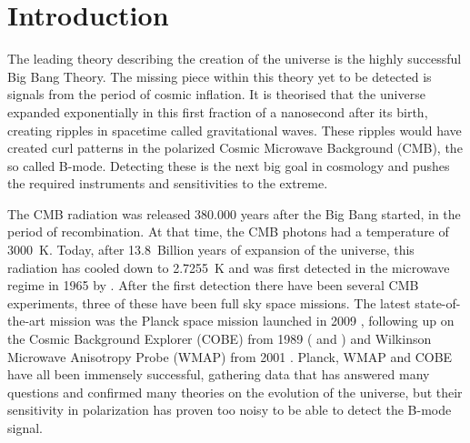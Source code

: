 \documentclass[twocolumn]{aa}
\begin{document}


\section{Introduction}
\label{sec:introduction}


The leading theory describing the creation of the universe is the highly successful Big Bang Theory. The missing piece within  this theory yet to be detected is signals from the period of cosmic inflation. It is theorised that the universe expanded exponentially in this first fraction of a nanosecond after its birth, creating ripples in spacetime called gravitational waves. These ripples would have created curl patterns in the polarized Cosmic Microwave Background (CMB), the so called B-mode. Detecting these is the next big goal in cosmology and pushes the required instruments and sensitivities to the extreme. 



The CMB radiation was released 380.000 years after the Big Bang started, in the period of recombination. At that time, the CMB photons had a temperature of 3000~K. Today, after 13.8~Billion years of expansion of the universe, this radiation has cooled down to 2.7255~K \citep{fixsen2009} and was first detected in the microwave regime in 1965 by \citet{penzias:1965}. After the first detection there have been several CMB experiments, three of these have been full sky space missions. The latest state-of-the-art mission was the Planck space mission launched in 2009 \citep{planck2016-l01}, following up on the Cosmic Background Explorer (COBE) from 1989 (\citealp{mather:1994} and \citealp{smoot:1992}) and Wilkinson Microwave Anisotropy Probe (WMAP) from 2001 \citep{bennett2012}. Planck, WMAP and COBE have all been immensely successful, gathering data that has answered many questions and confirmed many theories on the evolution of the universe, but their sensitivity in polarization has proven too noisy to be able to detect the B-mode signal. %
\end{document}

